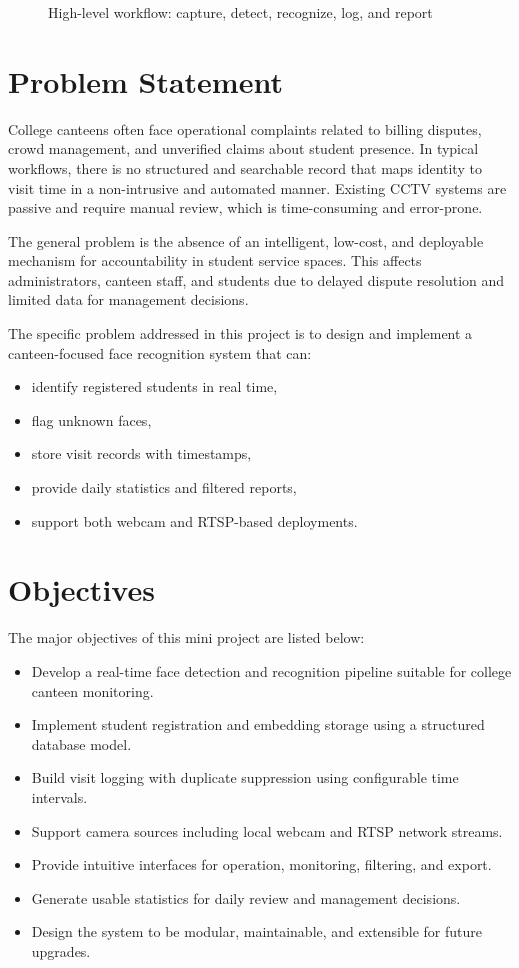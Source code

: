 \documentclass{fisatprojectfinal}
\begin{document}
\begin{figure}[h!]
	\begin{center}
		\fbox{\rule{0pt}{2in}\rule{0.8\linewidth}{0pt}}
		\caption{High-level workflow: capture, detect, recognize, log, and report}
	\end{center}
\end{figure}

\section{Problem Statement}
College canteens often face operational complaints related to billing disputes, crowd management, and unverified claims about student presence. In typical workflows, there is no structured and searchable record that maps identity to visit time in a non-intrusive and automated manner. Existing CCTV systems are passive and require manual review, which is time-consuming and error-prone.

The general problem is the absence of an intelligent, low-cost, and deployable mechanism for accountability in student service spaces. This affects administrators, canteen staff, and students due to delayed dispute resolution and limited data for management decisions.

The specific problem addressed in this project is to design and implement a canteen-focused face recognition system that can:
\begin{itemize}
	\item identify registered students in real time,
	\item flag unknown faces,
	\item store visit records with timestamps,
	\item provide daily statistics and filtered reports,
	\item support both webcam and RTSP-based deployments.
\end{itemize}

\section{Objectives}
The major objectives of this mini project are listed below:
\begin{itemize}
	\item Develop a real-time face detection and recognition pipeline suitable for college canteen monitoring.
	\item Implement student registration and embedding storage using a structured database model.
	\item Build visit logging with duplicate suppression using configurable time intervals.
	\item Support camera sources including local webcam and RTSP network streams.
	\item Provide intuitive interfaces for operation, monitoring, filtering, and export.
	\item Generate usable statistics for daily review and management decisions.
	\item Design the system to be modular, maintainable, and extensible for future upgrades.
\end{itemize}
\end{document}
